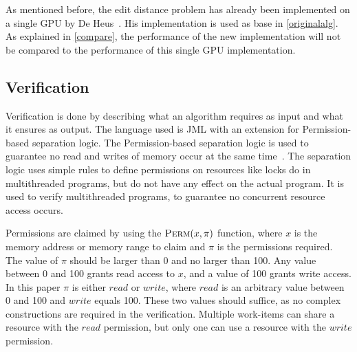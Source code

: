 As mentioned before, the edit distance problem has already been implemented on a single GPU by De Heus~\cite{Heus}.
His implementation is used as base in \cref{originalalg}.
As explained in \cref{compare}, the performance of the new implementation will not be compared to the performance of this single GPU implementation.

\subsection{Verification} \label{backver}
Verification is done by describing what an algorithm requires as input and what it ensures as output.
The language used is JML with an extension for Permission-based separation logic.
The Permission-based separation logic is used to guarantee no read and writes of memory occur at the same time~\cite{vercors}.
The separation logic uses simple rules to define permissions on resources like locks do in multithreaded programs, but do not have any effect on the actual program.
It is used to verify multithreaded programs, to guarantee no concurrent resource access occurs.

Permissions are claimed by using the $\textproc{Perm}(x, \pi)$ function, where $x$ is the memory address or memory range to claim and $\pi$ is the permissions required.
The value of $\pi$ should be larger than 0 and no larger than 100.
Any value between 0 and 100 grants read access to $x$, and a value of 100 grants write access.
In this paper $\pi$ is either $read$ or $write$, where $read$ is an arbitrary value between 0 and 100 and $write$ equals 100.
These two values should suffice, as no complex constructions are required in the verification.
Multiple work-items can share a resource with the $read$ permission, but only one can use a resource with the $write$ permission.
